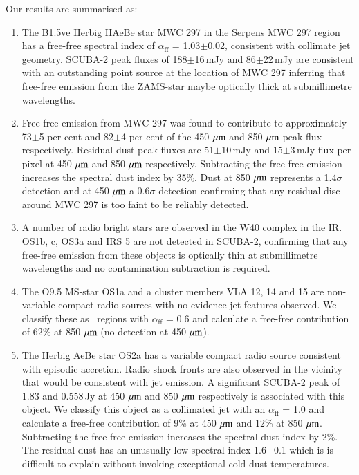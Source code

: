 Our results are summarised as:

\begin{enumerate}
\item The B1.5ve Herbig HAeBe star MWC 297 in the Serpens MWC 297 region has a free-free spectral index of $\alpha_{\mathrm{ff}}$ = 1.03$\pm$0.02, consistent with collimate jet geometry. SCUBA-2 peak fluxes of 188$\pm$16\,mJy and 86$\pm$22\,mJy are consistent with an outstanding point source at the location of MWC 297 inferring that free-free emission from the ZAMS-star maybe optically thick at submillimetre wavelengths.
\item Free-free emission from MWC 297 was found to contribute to approximately 73$\pm$5 per cent and 82$\pm$4 per cent of the 450\,$\,\mu\rm{m}$ and 850\,$\,\mu\rm{m}$ peak flux respectively. Residual dust peak fluxes are 51$\pm$10\,mJy and 15$\pm$3\,mJy flux per pixel at 450\,$\,\mu\rm{m}$ and 850\,$\,\mu\rm{m}$ respectively. Subtracting the free-free emission increases the spectral dust index by 35\%. Dust at 850\,$\,\mu\rm{m}$ represents a 1.4$\sigma$ detection and at 450\,$\,\mu\rm{m}$ a 0.6$\sigma$ detection confirming that any residual disc around MWC 297 is too faint to be reliably detected. 
\item A number of radio bright stars are observed in the W40 complex in the IR. OS1b, c, OS3a and IRS 5 are not detected in SCUBA-2, confirming that any free-free emission from these objects is optically thin at submillimetre wavelengths and no contamination subtraction is required.
\item The O9.5 MS-star OS1a and a cluster members VLA 12, 14 and 15 are non-variable compact radio sources with no evidence jet features observed. We classify these as \UCHII\ regions with $\alpha_{\mathrm{ff}}$ = 0.6 and calculate a free-free contribution of 62\% at 850\,$\,\mu\rm{m}$ (no detection at 450\,$\,\mu\rm{m}$).
\item The Herbig AeBe star OS2a has a variable compact radio source consistent with episodic accretion. Radio shock fronts are also observed in the vicinity that would be consistent with jet emission. A significant SCUBA-2 peak of 1.83 and 0.558\,Jy at 450\,$\,\mu\rm{m}$ and 850\,$\,\mu\rm{m}$ respectively is associated with this object. We classify this object as a collimated jet with an $\alpha_{\mathrm{ff}}$ = 1.0 and calculate a free-free contribution of 9\% at 450\,$\,\mu\rm{m}$ and 12\% at 850\,$\,\mu\rm{m}$. Subtracting the free-free emission increases the spectral dust index by 2\%. The residual dust has an unusually low spectral index 1.6$\pm$0.1 which is is difficult to explain without invoking exceptional cold dust temperatures. 

\end{enumerate}
